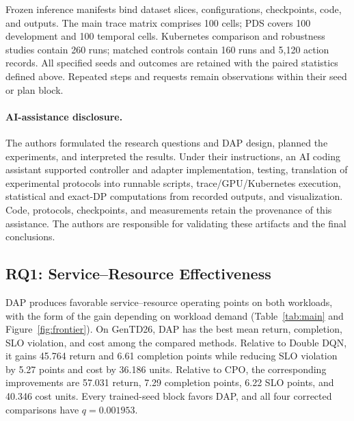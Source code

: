 \documentclass[acmsmall,screen,review,anonymous]{acmart}
\begin{document}
Frozen inference manifests bind dataset slices, configurations, checkpoints,
code, and outputs. The main trace matrix comprises 100 cells; PDS covers
100 development and 100 temporal cells. Kubernetes comparison and robustness
studies contain 260 runs; matched controls contain 160 runs and 5,120 action
records. All specified seeds and outcomes are retained with the paired
statistics defined above. Repeated steps and requests remain observations
within their seed or plan block.

\paragraph{AI-assistance disclosure.}
The authors formulated the research questions and DAP design, planned the
experiments, and interpreted the results. Under their instructions, an AI
coding assistant supported controller and adapter implementation, testing,
translation of experimental protocols into runnable scripts,
trace/GPU/Kubernetes execution, statistical and exact-DP computations from
recorded outputs, and visualization. Code, protocols, checkpoints, and
measurements retain the provenance of this assistance. The authors are
responsible for validating these artifacts and the final conclusions.

\subsection{RQ1: Service--Resource Effectiveness}

DAP produces favorable service--resource operating points on both workloads,
with the form of the gain depending on workload demand
(Table~\ref{tab:main} and Figure~\ref{fig:frontier}). On GenTD26, DAP has the best mean return,
completion, SLO violation, and cost among the compared methods. Relative to Double DQN, it
gains 45.764 return and 6.61 completion points while reducing SLO violation by
5.27 points and cost by 36.186 units. Relative to CPO, the corresponding
improvements are 57.031 return, 7.29 completion points, 6.22 SLO points, and
40.346 cost units. Every trained-seed block favors DAP, and all four corrected
comparisons have \(q=0.001953\).
\end{document}
